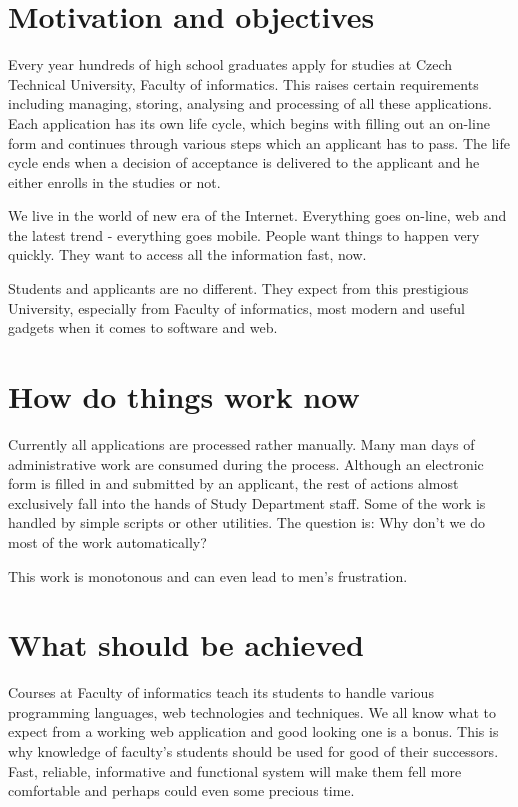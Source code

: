 \begin{introduction}
	\section{Motivation and objectives}

	Every year hundreds of high school graduates apply for studies at Czech Technical University, Faculty of informatics.
	This raises certain requirements including managing, storing, analysing and processing of all these applications.
	Each application has its own life cycle, which begins with filling out an on-line form and continues through various
	steps which an applicant has to pass. The life cycle ends when a decision of acceptance is delivered to the applicant
	and he either enrolls in the studies or not.
	
	We live in the world of new era of the Internet. Everything goes on-line, web and the latest trend - everything goes
	mobile. People want things to happen very quickly. They want to access all the information fast, now.
	
	Students and applicants are no different. They expect from this prestigious University, especially from Faculty of
	informatics, most modern and useful gadgets when it comes to software and web.
	
	\section{How do things work now}
	
	Currently all applications are processed rather manually. Many man days of administrative work are consumed during the
	process. Although an electronic form is filled in and submitted by an applicant, the rest of actions almost exclusively
	fall into the hands of Study Department staff. Some of the work is handled by simple scripts or other utilities. The
	question is: Why don't we do most of the work automatically?
	
	This work is monotonous and can even lead to men's frustration.
	
	\section{What should be achieved}
	
	Courses at Faculty of informatics teach its students to handle various programming languages, web technologies and
	techniques.
	We all know what to expect from a working web application and good looking one is a bonus. This is why knowledge of
	faculty's students should be used for good of their successors. Fast, reliable, informative and functional system will
	make them fell more comfortable and perhaps could even some precious time.
	

\end{introduction}
